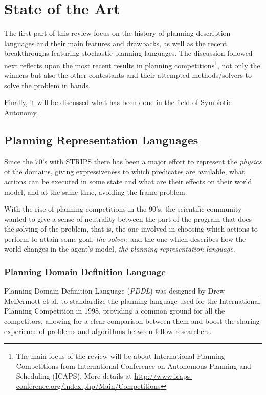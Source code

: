 
\chapter{State of the Art}
\label{chapter:stateoftheart}
The first part of this review focus on the history of planning description
languages and their main features and drawbacks, as well as the recent
breakthroughs featuring stochastic planning languages.
The discussion followed next reflects upon the most recent results in
planning competitions\footnote{The main focus of the review will be about
International Planning Competitions from International Conference on Autonomous
Planning and Scheduling (ICAPS). More details at
\url{http://www.icaps-conference.org/index.php/Main/Competitions}},
not only the winners but also the other contestants and their attempted
methods/solvers to solve the problem in hands.

Finally, it will be discussed what has been done in the field of Symbiotic
Autonomy.

\section{Planning Representation Languages}
Since the 70's with STRIPS \cite{Fikes1971} there has been a major effort to
represent the \textit{physics} of the domains, giving expressiveness to which
predicates are available, what actions can be executed in some state and what
are their effects on their world model, and at the same time, avoiding the
frame problem.

With the rise of planning competitions in the 90's, the scientific community
wanted to give a sense of neutrality between the part of the program that does
the solving of the problem, that is, the one involved in choosing which actions
to perform to attain some goal, \textit{the solver}, and the one which describes
how the world changes in the agent's model, \textit{the planning representation
language}.

\subsection{Planning Domain Definition Language}
Planning Domain Definition Language (\textit{PDDL}) was designed by
Drew McDermott et al. \cite{McDermott1998} to standardize
the planning language used for the International Planning Competition in 1998,
providing a common ground for all the competitors, allowing for a clear
comparison between them and boost the sharing experience of
problems and algorithms between fellow researchers.

